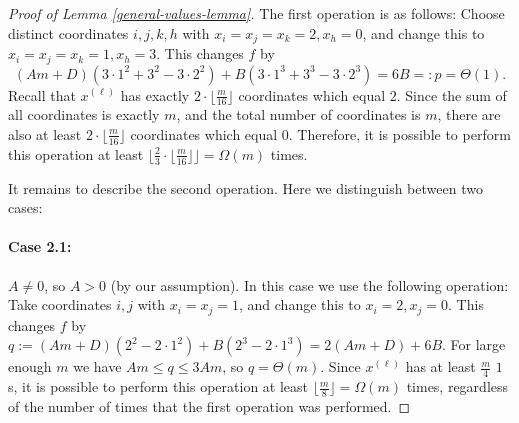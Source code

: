 \documentclass[10pt,a4paper]{amsart}
\begin{document}
\begin{proof}[Proof of Lemma \ref{general-values-lemma}]
    The first operation is as follows: Choose distinct coordinates $i,j,k,h$ with $x_i = x_j = x_k = 2, x_h = 0$, and change this to $x_i = x_j = x_k = 1, x_h = 3$. This changes $f$ by 
    $$(Am+D)(3 \cdot 1^2 + 3^2 - 3 \cdot 2^2) + B(3 \cdot 1^3 + 3^3 - 3 \cdot 2^3) = 6B =: p = \Theta(1).$$ 
    Recall that $x^{(\ell)}$ has exactly $2 \cdot \lfloor \frac{m}{16} \rfloor$ coordinates which equal $2$. Since the sum of all coordinates is exactly $m$, and the total number of coordinates is $m$, there are also at least $2 \cdot \lfloor \frac{m}{16} \rfloor$ coordinates which equal $0$. 
    Therefore, it is possible to perform this operation at least 
    $\lfloor \frac{2}{3} \cdot \lfloor \frac{m}{16} \rfloor \rfloor = \Omega(m)$ times. 
    
    It remains to describe the second operation. Here we distinguish between two cases: 
    \paragraph{Case 2.1:} $A \neq 0$, so $A > 0$ (by our assumption). In this case we use the following operation: 
    Take coordinates $i,j$ with $x_i = x_j = 1$, and change this to $x_i = 2, x_j = 0$. This changes $f$ by 
    $
    q := (Am+D)(2^2 - 2 \cdot 1^2) + B(2^3 - 2 \cdot 1^3) = 2(Am+D) + 6B.
    $
    For large enough $m$ we have $Am \leq q \leq 3Am$, so $q = \Theta(m)$. 
    Since $x^{(\ell)}$ has at least $\frac{m}{4}$ $1$s, it is possible to perform this operation at least $\lfloor \frac{m}{8} \rfloor = \Omega(m)$ times, regardless of the number of times that the first operation was performed. 
    

\end{proof}
\end{document}
